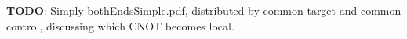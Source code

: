 \textbf{TODO}: Simply bothEndsSimple.pdf, distributed by common target and common control, discussing which CNOT becomes local.